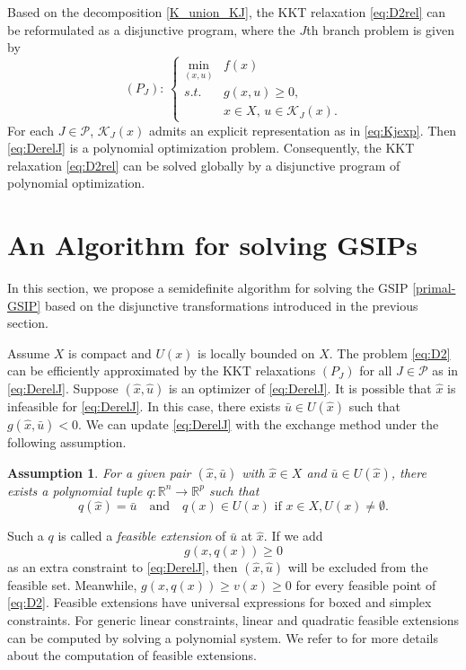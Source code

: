 \documentclass{amsart}
\theoremstyle{plain}
\newtheorem{assumption}[theorem]{Assumption}
\newcommand{\re}{\mathbb{R}}
\newcommand{\st}{\mathit{s.t.}}
\newcommand{\mc}[1]{\mathcal{#1}}
\numberwithin{equation}{section}
\begin{document}
		Based on the decomposition \eqref{K_union_KJ}, the KKT relaxation 
		\eqref{eq:D2rel} can be reformulated as a disjunctive program, 
        where the $J$th branch problem is given by 
		\begin{equation}\label{eq:DerelJ}
		(P_J):\,	\left\{\begin{array}{cl}
				\min\limits_{(x,u)} & f(x)\\
				\st & g(x,u)\ge 0,\\
				& x\in X,\, u\in \mc{K}_J(x).
			\end{array}\right.
		\end{equation}
		For each $J\in \mc{P}$, $\mc{K}_J(x)$ admits an explicit representation as in \eqref{eq:Kjexp}. 
		Then \eqref{eq:DerelJ} is a polynomial optimization problem. 
		Consequently, the KKT relaxation \eqref{eq:D2rel} can be solved globally 
		by a disjunctive program of polynomial optimization.
		
		
		
		\section{An Algorithm for solving GSIPs}\label{sc:DP}
		
		In this section, we propose a semidefinite algorithm for solving the GSIP
		\eqref{primal-GSIP} based on the disjunctive transformations introduced 
		in the previous section. 
		
		Assume $X$ is compact and $U(x)$ is locally bounded on $X$.
		The problem \eqref{eq:D2} can be efficiently approximated by
		the	KKT relaxations $(P_J)$ for all $J\in \mc{P}$ as in \eqref{eq:DerelJ}.
		Suppose $(\hat{x}, \hat{u})$ is an optimizer of \eqref{eq:DerelJ}.
		It is possible that $\hat{x}$ is infeasible for \eqref{eq:DerelJ}.
		In this case, there exists $\bar{u}\in U(\hat{x})$ such that $g(\hat{x}, \bar{u})<0$.
		We can update \eqref{eq:DerelJ} with the exchange method 
		under the following assumption.
		\begin{assumption}\label{as:feasext}
			For  a given pair $(\hat{x},\bar{u})$ with $\hat{x}\in X$ and $\bar{u}\in U(\hat{x})$,
			there exists a polynomial tuple $q: \re^n\to \re^p$ such that
			\begin{equation}\label{eq:feasext}
				q(\hat{x}) = \bar{u}\quad \mbox{and}\quad q(x)\in U(x)\,\,\mbox{if $x\in X, U(x)\not=\emptyset$}.
			\end{equation}
		\end{assumption}
		Such a $q$ is called a \emph{feasible extension} of $\bar{u}$ at $\hat{x}$. 
		If we add 
		\[
		g(x,q(x))\ge 0
		\]
		as an extra constraint to \eqref{eq:DerelJ}, then $(\hat{x}, \hat{u})$ will be 
		excluded from the feasible set. Meanwhile, $g(x,q(x))\ge v(x)\ge 0$ 
		for every feasible point of \eqref{eq:D2}. 
		Feasible extensions have universal expressions for boxed and simplex constraints. 
		For generic linear constraints, linear and quadratic feasible extensions can be 
		computed by solving a polynomial system.
        We refer to \cite{HuNie23,nie2023plmes} for more details about the computation
        of feasible extensions.
		
\end{document}
